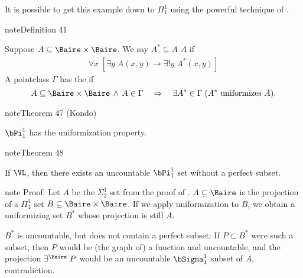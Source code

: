 \documentclass[letterpaper,10pt,english]{jupyterBook}
\begin{document}
\sphinxAtStartPar
It is possible to get this example down to \(\Pi^1_1\) using the powerful technique of .
\label{constructible-reals:def-uniformization}
\begin{sphinxadmonition}{note}{Definition 41}



\sphinxAtStartPar
Suppose \(A \subseteq \Baire \times \Baire\). We say \(A^* \subseteq A\)  \(A\) if
\begin{equation*}
\begin{split}
\forall x  \; [ \exists y \; A(x,y) \to  \exists ! y \; A^*(x,y)]
\end{split}
\end{equation*}
\sphinxAtStartPar
A pointclass \(\Gamma\) has the  if
\begin{equation*}
A \subseteq \Baire  \times \Baire \, \wedge \, A \in \Gamma \quad \Rightarrow \quad \exists A^* \in  \Gamma \; (A^*  \text{ uniformizes } A).
\end{equation*}\end{sphinxadmonition}
\label{constructible-reals:thm-Kondo}
\begin{sphinxadmonition}{note}{Theorem 47 (Kondo)}



\sphinxAtStartPar
\(\bPi^1_1\) has the uniformization property.
\end{sphinxadmonition}
\label{constructible-reals:thm-prefect-set-L}
\begin{sphinxadmonition}{note}{Theorem 48}



\sphinxAtStartPar
If \(\VL\), then there exists an uncountable \(\bPi^1_1\) set without a perfect subset.
\end{sphinxadmonition}

\begin{sphinxadmonition}{note}
\sphinxAtStartPar
Proof. Let \(A\) be the \(\Sigma^1_2\) set from the proof of {\hyperref[\detokenize{constructible-reals:prop-sigma12-perfect}]{}}. \(A \subseteq \Baire\) is the projection of a \(\Pi^1_1\) set \(B \subseteq \Baire \times \Baire\). If we apply uniformization to \(B\), we obtain a uniformizing set \(B^*\) whose projection is still \(A\).

\sphinxAtStartPar
\(B^*\) is uncountable, but does not contain a perfect subset: If \(P \subset B^*\) were such a subset, then \(P\) would be (the graph of) a function and uncountable, and the projection \(\exists^{\Baire} \; P\) would be an uncountable  \(\bSigma^1_1\) subset of \(A\), contradiction.
\end{sphinxadmonition}
\end{document}
